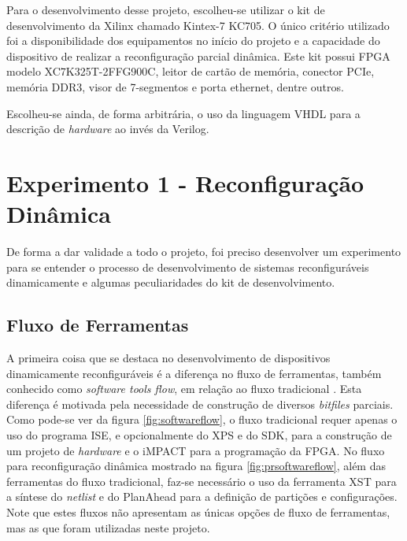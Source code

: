 \documentclass[11pt,a4paper,oneside]{book}
\begin{document}
Para o desenvolvimento desse projeto, escolheu-se utilizar o kit de desenvolvimento da Xilinx\textregistered{} chamado Kintex-7 KC705.
O único critério utilizado foi a disponibilidade dos equipamentos no início do projeto e a capacidade do dispositivo de realizar a reconfiguração parcial dinâmica.
Este kit possui FPGA modelo XC7K325T-2FFG900C, leitor de cartão de memória, conector PCIe\textregistered{}, memória DDR3, visor de 7-segmentos e porta ethernet, dentre outros.

Escolheu-se ainda, de forma arbitrária, o uso da linguagem VHDL para a descrição de \textit{hardware} ao invés da Verilog.

\section{Experimento 1 - Reconfiguração Dinâmica}
De forma a dar validade a todo o projeto, foi preciso desenvolver um experimento para se entender o processo de desenvolvimento de sistemas reconfiguráveis dinamicamente e algumas peculiaridades do kit de desenvolvimento.

\subsection{Fluxo de Ferramentas}
A primeira coisa que se destaca no desenvolvimento de dispositivos dinamicamente reconfiguráveis é a diferença no fluxo de ferramentas, também conhecido como \textit{software tools flow}, em relação ao fluxo tradicional \cite{ug743}.
Esta diferença é motivada pela necessidade de construção de diversos \textit{bitfiles} parciais.
Como pode-se ver da figura \ref{fig:softwareflow}, o fluxo tradicional requer apenas o uso do programa ISE, e opcionalmente do XPS e do SDK, para a construção de um projeto de \textit{hardware} e o iMPACT para a programação da FPGA.
No fluxo para reconfiguração dinâmica mostrado na figura \ref{fig:prsoftwareflow}, além das ferramentas do fluxo tradicional, faz-se necessário o uso da ferramenta XST para a síntese do \textit{netlist} e do PlanAhead para a definição de partições e configurações.
Note que estes fluxos não apresentam as únicas opções de fluxo de ferramentas, mas as que foram utilizadas neste projeto.
\end{document}
